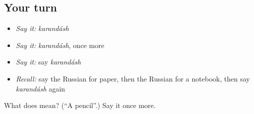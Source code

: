 \subsection*{Your turn}
\begin{itemize}
\raggedright
  \item \emph{Say it:} \emph{karandásh}
  \item \emph{Say it:} \emph{karandásh}, once more
  \item \emph{Say it:} say \emph{karandásh}
  \item \emph{Recall:} say the Russian for paper, then the Russian for a notebook, then say \emph{karandásh} again
\end{itemize}

\begin{tcolorbox}[breakable,colback=teal!4,colframe=teal!35!black,title={Before you move on}]
What does  mean? (\textquotedblleft{}A pencil\textquotedblright{}.) Say it once more.
\end{tcolorbox}
